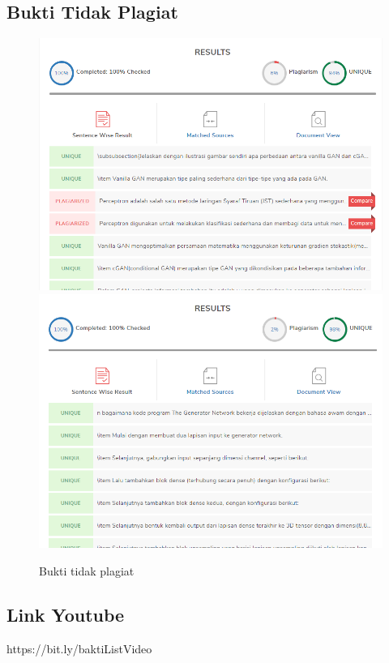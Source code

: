 \subsection{Bukti Tidak Plagiat}
\begin{figure}[H]
	\centering
	\includegraphics[width=12cm]{figures/1174083/figures9/plagiarisme1.png}
	\includegraphics[width=12cm]{figures/1174083/figures9/plagiarisme2.png}
	\caption{Bukti tidak plagiat}
\end{figure}

\subsection{Link Youtube}
https://bit.ly/baktiListVideo